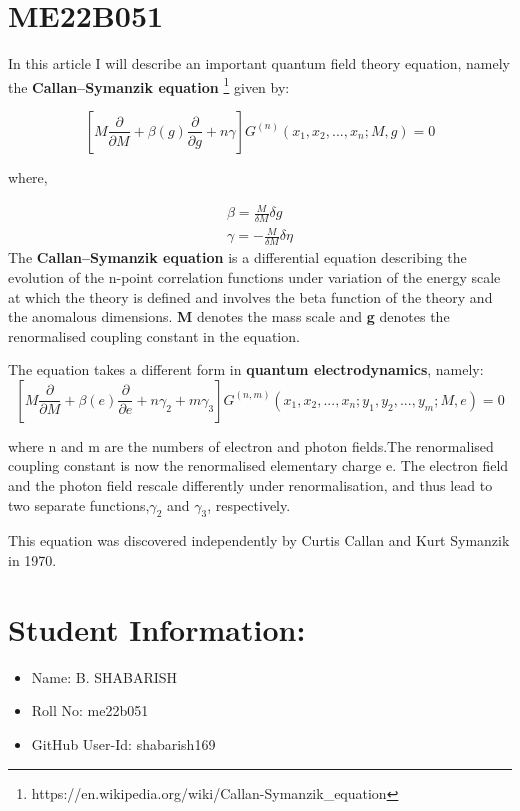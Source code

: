 \section*{ME22B051}
In this article I will describe an important quantum field theory equation, namely the \textbf{Callan–Symanzik equation} \footnote[1]{https://en.wikipedia.org/wiki/Callan-Symanzik\_equation} given by:

\begin{equation}
\left[  M\frac{\partial }{\partial M} + \beta\left( g \right)\frac{\partial }{\partial g}+n\gamma  \right]G^{\left(n\right)} \left( x_{1},x_{2},...,x_{n};M,g\right)=0 
\end{equation}



where,

\begin{eqnarray}
\beta=\frac{M}{\delta M} \delta g 
\\ \gamma=-\frac{M}{\delta M} \delta \eta
\end{eqnarray}
The \textbf{Callan–Symanzik equation} is a differential equation describing the evolution of the n-point correlation functions under variation of the energy scale at which the theory is defined and involves the beta function of the theory and the anomalous dimensions. \textbf{M} denotes the mass scale and \textbf{g} denotes the renormalised coupling constant in the equation.

The equation takes a different form in \textbf{quantum electrodynamics}, namely:
\begin{equation}
\left[  M\frac{\partial }{\partial M} + \beta\left( e \right)\frac{\partial }{\partial e}+n\gamma_2+m\gamma_3  \right]G^{\left(n,m\right)} \left( x_{1},x_{2},...,x_{n};y_{1},y_{2},...,y_{m};M,e\right)=0 
\end{equation}

where n and m are the numbers of electron and photon fields.The renormalised coupling constant is now the renormalised elementary charge e. The electron field and the photon field rescale differently under renormalisation, and thus lead to two separate functions,$\gamma_{2}$ and $\gamma_{3}$, respectively.


This equation was discovered independently by Curtis Callan and Kurt Symanzik in 1970. 

\section*{Student Information:}
\begin{itemize}
    \item Name: B. SHABARISH 
    \item Roll No: me22b051
    \item GitHub User-Id: shabarish169
\end{itemize}
